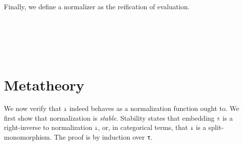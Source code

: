 \documentclass[authoryear, acmsmall, screen, review, nonacm]{acmart}
\begin{document}
Finally, we define a normalizer as the reification of evaluation.

\begin{code}%
\>[0]\AgdaSpace{}%
\AgdaSymbol{:}\AgdaSpace{}%
\AgdaSpace{}%
\AgdaSymbol{\{}\AgdaSymbol{\}}\AgdaSpace{}%
\AgdaSpace{}%
\AgdaSpace{}%
\AgdaSpace{}%
\AgdaSpace{}%
\AgdaSpace{}%
\AgdaSpace{}%
\AgdaSpace{}%
\<%
\\
\>[0]\AgdaSpace{}%
\AgdaSpace{}%
\AgdaSymbol{=}\AgdaSpace{}%
\AgdaSpace{}%
\AgdaSymbol{(}\AgdaSpace{}%
\AgdaSpace{}%
\AgdaSymbol{)}\<%
\\
%
\\[\AgdaEmptyExtraSkip]%
\>[0]\AgdaSpace{}%
\AgdaSymbol{:}\AgdaSpace{}%
\AgdaSpace{}%
\AgdaSymbol{\{}\AgdaSymbol{\}}\AgdaSpace{}%
\AgdaSpace{}%
\AgdaSpace{}%
\AgdaSpace{}%
\AgdaSpace{}%
\AgdaSpace{}%
\AgdaSpace{}%
\AgdaSpace{}%
\<%
\\
\>[0]\AgdaSpace{}%
\AgdaSpace{}%
\AgdaSymbol{=}\AgdaSpace{}%
\AgdaSpace{}%
\AgdaSymbol{(}\AgdaSpace{}%
\AgdaSymbol{(}\AgdaSpace{}%
\AgdaSymbol{)}\AgdaSpace{}%
\AgdaSymbol{)}\<%
\end{code}

\section{Metatheory}


\InlineOn{}
We now verify that \verb!⇓! indeed behaves as a normalization function ought to. We first show that normalization is \emph{stable}. Stability states that embedding \verb!⇑! is a right-inverse to normalization \verb!⇓!, or, in categorical terms, that \verb!⇓! is a split-monomorphism. The proof is by induction over \verb!τ!.
\end{document}

